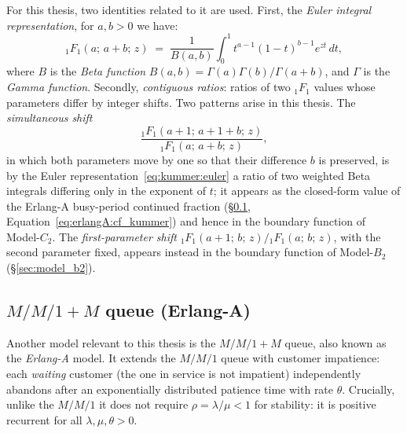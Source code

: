 For this thesis, two identities related to it are used.
First, the \emph{Euler integral representation}, for $a,b>0$ we have:
\begin{equation}
    {}_1F_1(a;\,a+b;\,z) \;=\; \frac{1}{B(a,b)} \int_0^1 t^{a-1}(1-t)^{b-1} e^{zt}\,dt,
    \label{eq:kummer:euler}
\end{equation}
where $B$ is the \emph{Beta function} $B(a,b)=\Gamma(a)\Gamma(b)/\Gamma(a+b)$, and $\Gamma$ is the \emph{Gamma function}.
Secondly, \emph{contiguous ratios}: ratios of two ${}_1F_1$ values whose parameters
differ by integer shifts. Two patterns arise in this thesis. The \emph{simultaneous
shift}
\begin{equation}
    \frac{{}_1F_1(a+1;\,a+1+b;\,z)}{{}_1F_1(a;\,a+b;\,z)},
    \label{eq:kummer:ratio}
\end{equation}
in which both parameters move by one so that their difference $b$ is preserved, is by
the Euler representation~\eqref{eq:kummer:euler} a ratio of two weighted Beta integrals
differing only in the exponent of $t$; it appears as the closed-form value of the
Erlang-A busy-period continued fraction (\S\ref{ssec:erlangA},
Equation~\eqref{eq:erlangA:cf_kummer}) and hence in the boundary function of
Model-$C_2$. The \emph{first-parameter shift}
${}_1F_1(a+1;\,b;\,z)\big/{}_1F_1(a;\,b;\,z)$, with the second parameter fixed, appears
instead in the boundary function of Model-$B_2$ (\S\ref{sec:model_b2}).

\subsection{\texorpdfstring{$M/M/1{+}M$}{M/M/1+M} queue (Erlang-A)}\label{ssec:erlangA}

Another model relevant to this thesis is the $M/M/1+M$ queue, also known as the \emph{Erlang-A} model. It extends the $M/M/1$ queue with customer impatience: each \emph{waiting} customer (the one in service is not impatient) independently abandons after an exponentially distributed patience time with rate $\theta$. Crucially, unlike the $M/M/1$ it does not require $\rho=\lambda/\mu<1$ for stability: it is positive recurrent for all $\lambda, \mu, \theta > 0$.

